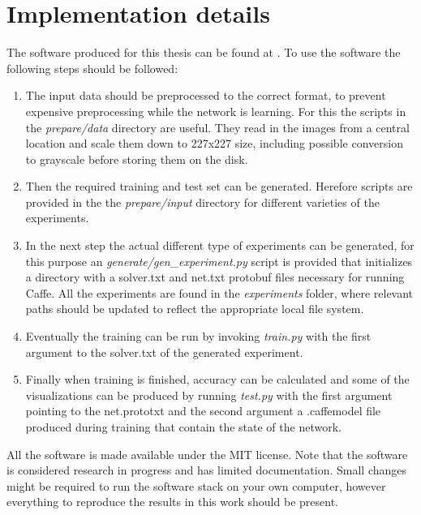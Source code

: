 %
\chapter{Implementation details}
\label{app:implementation_details}

The software produced for this thesis can be found at \needref. To use the software the following steps should be followed:
\begin{enumerate}
\item The input data should be preprocessed to the correct format, to prevent expensive preprocessing while the network is learning. For this the scripts in the \textit{prepare/data} directory are useful. They read in the images from a central location and scale them down to 227x227 size, including possible conversion to grayscale before storing them on the disk.
\item Then the required training and test set can be generated. Herefore scripts are provided in the the \textit{prepare/input} directory for different varieties of the experiments.
\item In the next step the actual different type of experiments can be generated, for this purpose an \textit{generate/gen\_experiment.py} script is provided that initializes a directory with a solver.txt and net.txt protobuf files necessary for running Caffe. All the experiments are found in the \textit{experiments} folder, where relevant paths should be updated to reflect the appropriate local file system.
\item Eventually the training can be run by invoking \textit{train.py} with the first argument to the solver.txt of the generated experiment. 
\item Finally when training is finished, accuracy can be calculated and some of the visualizations can be produced by running \textit{test.py} with the first argument pointing to the net.prototxt and the second argument a .caffemodel file produced during training that contain the state of the network.
\end{enumerate}
All the software is made available under the MIT license. Note that the software is considered research in progress and has limited documentation. Small changes might be required to run the software stack on your own computer, however everything to reproduce the results in this work should be present.
